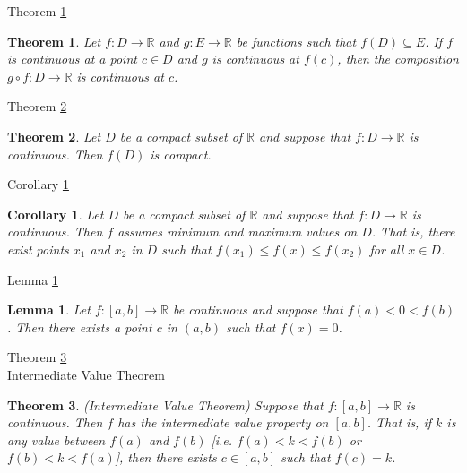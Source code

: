\documentclass[avery5371,grid]{flashcards}
\newtheorem{lemma}{Lemma}
\newtheorem{corollary}{Corollary}
\newtheorem{theorem}{Theorem}
\newcommand{\bb}[1]{\mathbb{#1}}
\newcommand{\R}{\bb{R}}
\begin{document}
\begin{flashcard}[Theorem]{Theorem \ref{thm72}}
\begin{theorem}
\label{thm72}
Let $f: D \to \R$ and $g: E \to \R$ be functions such that $f(D)
\subseteq E$.  If $f$ is continuous at a point $c \in D$ and $g$ is
continuous at $f(c)$, then the composition $g \circ f : D \to \R$ is
continuous at $c$.
\end{theorem}
\end{flashcard}

\begin{flashcard}[Theorem]{Theorem \ref{thm73}}
\begin{theorem}
\label{thm73}
Let $D$ be a compact subset of $\R$ and suppose that $f: D \to \R$ is
continuous.  Then $f(D)$ is compact.
\end{theorem}
\end{flashcard}

\begin{flashcard}[Corollary]{Corollary \ref{cor05}}
\begin{corollary}
\label{cor05}
Let $D$ be a compact subset of $\R$ and suppose that $f : D \to \R$ is
continuous.  Then $f$ assumes minimum and maximum values on $D$.  That
is, there exist points $x_1$ and $x_2$ in $D$ such that $f(x_1) \leq f(x)
\leq f(x_2)$ for all $x \in D$.
\end{corollary}
\end{flashcard}

\begin{flashcard}[Lemma]{Lemma \ref{lem04}}
\begin{lemma}
\label{lem04}
Let $f: [a,b] \to \R$ be continuous and suppose that $f(a) < 0 < f(b)$.
Then there exists a point $c$ in $(a,b)$ such that $f(x) = 0$.
\end{lemma}
\end{flashcard}

\begin{flashcard}[Theorem]{Theorem \ref{thm74} \\ Intermediate Value
Theorem}
\begin{theorem}
\label{thm74}
(Intermediate Value Theorem)  Suppose that $f:[a,b] \to \R$ is
continuous.  Then $f$ has the intermediate value property on $[a,b]$.
That is, if $k$ is any value between $f(a)$ and $f(b)$
[i.e. $f(a) < k < f(b)$ or $f(b) < k < f(a)$], then there exists
$c \in [a,b]$ such that $f(c) = k$.
\end{theorem}
\end{flashcard}
\end{document}
